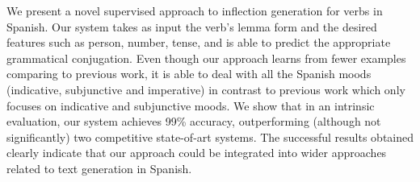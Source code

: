 We present a novel supervised approach to inflection generation for verbs in Spanish. Our system takes as input the verb's lemma form and the desired features such as person, number, tense, and is able to predict the appropriate grammatical conjugation. Even though our approach learns from fewer examples comparing to previous work, it is able to deal with all the Spanish moods (indicative, subjunctive and imperative) in contrast to previous work which only focuses on indicative and subjunctive moods. We show that in an intrinsic evaluation, our system achieves 99\% accuracy, outperforming (although not significantly) two competitive state-of-art systems. The successful results obtained clearly indicate that our approach could be integrated into wider approaches related to text generation in Spanish.
